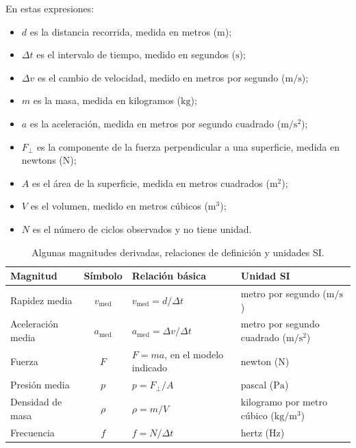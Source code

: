 En estas expresiones:

\begin{itemize}
    \item \(d\) es la distancia recorrida, medida en metros (\(\text{m}\));
    \item \(\Delta t\) es el intervalo de tiempo, medido en segundos (\(\text{s}\));
    \item \(\Delta v\) es el cambio de velocidad, medido en metros por segundo (\(\text{m}/\text{s}\));
    \item \(m\) es la masa, medida en kilogramos (\(\text{kg}\));
    \item \(a\) es la aceleración, medida en metros por segundo cuadrado (\(\text{m}/\text{s}^{2}\));
    \item \(F_\perp\) es la componente de la fuerza perpendicular a una superficie, medida en newtons (\(\text{N}\));
    \item \(A\) es el área de la superficie, medida en metros cuadrados (\(\text{m}^{2}\));
    \item \(V\) es el volumen, medido en metros cúbicos (\(\text{m}^{3}\));
    \item \(N\) es el número de ciclos observados y no tiene unidad.
\end{itemize}

\begin{table}[htbp]
    \centering
    \setlength{\tabcolsep}{4pt}
    \begin{tabular}{|>{\raggedright\arraybackslash}p{}|c|>{\raggedright\arraybackslash}p{}|>{\raggedright\arraybackslash}p{}|}
        \hline
        \textbf{Magnitud} & \textbf{Símbolo} & \textbf{Relación básica} & \textbf{Unidad SI} \\
        \hline
        Rapidez media & \(v_\mathrm{med}\) & \(v_\mathrm{med}=d/\Delta t\) & metro por segundo (\(\text{m}/\text{s}\)) \\
        Aceleración media & \(a_\mathrm{med}\) & \(a_\mathrm{med}=\Delta v/\Delta t\) & metro por segundo cuadrado (\(\text{m}/\text{s}^{2}\)) \\
        Fuerza & \(F\) & \(F=ma\), en el modelo indicado & newton (\(\text{N}\)) \\
        Presión media & \(p\) & \(p=F_\perp/A\) & pascal (\(\text{Pa}\)) \\
        Densidad de masa & \(\rho\) & \(\rho=m/V\) & kilogramo por metro cúbico (\(\text{kg}/\text{m}^{3}\)) \\
        Frecuencia & \(f\) & \(f=N/\Delta t\) & hertz (\(\text{Hz}\)) \\
        \hline
    \end{tabular}
    \caption{Algunas magnitudes derivadas, relaciones de definición y unidades SI.}
    \label{tab:u1-magnitudes-derivadas}
\end{table}

